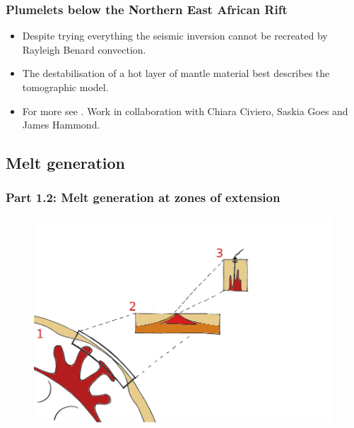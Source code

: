\documentclass[aspectratio=169]{beamer}
\begin{document}
\begin{frame}
    \frametitle{Plumelets below the Northern East African Rift}
    \begin{itemize}
    \item{Despite trying everything the seismic inversion cannot be recreated by Rayleigh Benard convection.}
    \item{The destabilisation of a hot layer of mantle material best describes the tomographic model.}
    \item{For more see \cite{civiero-etal-2020}. Work in collaboration with Chiara Civiero, Saskia Goes and James Hammond.}
    \end{itemize}
\end{frame}

\subsection{Melt generation}

\begin{frame}
    \frametitle{Part 1.2: Melt generation at zones of extension}
    \begin{figure}
        \includegraphics[height=0.9\paperheight]{./pictures/drawing.png}
    \end{figure}
\end{frame}
\end{document}
